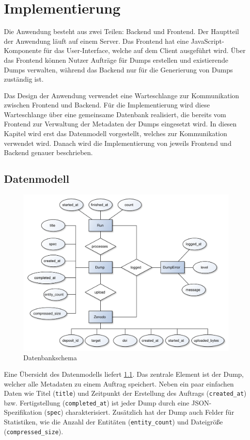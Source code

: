 \chapter{Implementierung}
\label{chap:implementation}
Die Anwendung besteht aus zwei Teilen: Backend und Frontend.
Der Hauptteil der Anwendung läuft auf einem Server.
Das Frontend hat eine JavaScript-Komponente für das User-Interface, welche auf dem Client ausgeführt wird.
Über das Frontend können Nutzer Aufträge für Dumps erstellen und existierende Dumps verwalten, während das Backend nur für die Generierung von Dumps zuständig ist.

Das Design der Anwendung verwendet eine Warteschlange zur Kommunikation zwischen Frontend und Backend.
Für die Implementierung wird diese Warteschlange über eine gemeinsame Datenbank realisiert, die bereits vom Frontend zur Verwaltung der Metadaten der Dumps eingesetzt wird.
In diesen Kapitel wird erst das Datenmodell vorgestellt, welches zur Kommunikation verwendet wird.
Danach wird die Implementierung von jeweils Frontend und Backend genauer beschrieben.

\section{Datenmodell}
\begin{figure}
  \includegraphics[width=\textwidth]{pics/db-er}
  \caption{Datenbankschema}
  \label{fig:db-er}
\end{figure}
Eine Übersicht des Datenmodells liefert \cref{fig:db-er}.
Das zentrale Element ist der Dump, welcher alle Metadaten zu einem Auftrag speichert.
Neben ein paar einfachen Daten wie Titel (\verb|title|) und Zeitpunkt der Erstellung des Auftrags (\verb|created_at|) bzw. Fertigstellung (\verb|completed_at|) ist jeder Dump durch eine JSON-Spezifikation (\verb|spec|) charakterisiert. Zusätzlich hat der Dump auch Felder für Statistiken, wie die Anzahl der Entitäten (\verb|entity_count|) und Dateigröße (\verb|compressed_size|).


